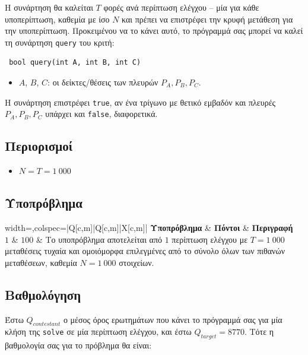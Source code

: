 \documentclass[12pt]{article}
\begin{document}
Η συνάρτηση θα καλείται $T$ φορές ανά περίπτωση ελέγχου -- μία για κάθε υποπερίπτωση, καθεμία με ίσο $N$ και πρέπει να επιστρέφει την κρυφή μετάθεση για την υποπερίπτωση. Προκειμένου να το κάνει αυτό, το πρόγραμμά σας μπορεί να καλεί τη συνάρτηση \texttt{query} του κριτή:
\begin{lstlisting}
 bool query(int A, int B, int C)
\end{lstlisting}
\begin{itemize}
	\item $A$, $B$, $C$: οι δείκτες/θέσεις των πλευρών $P_A, P_B, P_C$.
\end{itemize}

Η συνάρτηση επιστρέφει \texttt{true}, αν ένα τρίγωνο με θετικό εμβαδόν και πλευρές $P_A,P_B,P_C$ υπάρχει και \texttt{false}, διαφορετικά.

\subsection{Περιορισμοί}
\vspace{0.1em}
\begin{itemize}
	\item $N = T = 1~000$
\end{itemize}

\subsection{Υποπρόβλημα}
\begin{table}[H]
	\begin{tblr}{width=\linewidth,colspec={|Q[c,m]|Q[c,m]|X[c,m]|}}
		\hline
		\textbf{Υποπρόβλημα} & \textbf{Πόντοι} & \textbf{Περιγραφή}\\
		\hline
		$1$ & $100$ & Το υποπρόβλημα αποτελείται από $1$ περίπτωση ελέγχου με $T=1~000$ μεταθέσεις τυχαία και ομοιόμορφα επιλεγμένες από το σύνολο όλων των πιθανών μεταθέσεων, καθεμία $N=1~000$ στοιχείων.  \\ 
		\hline
	\end{tblr}
	\caption*{Οι πόντοι ενός υποπροβλήματος απονέμονται μόνο αν όλες οι περιπτώσεις (και υποπεριπτώσεις) ελέγχου αυτού περαστούν επιτυχώς.}
\end{table}
\FloatBarrier

\newpage
\subsection{Βαθμολόγηση}

Έστω $Q_{contestant}$ ο μέσος όρος ερωτημάτων που κάνει το πρόγραμμά σας για μία κλήση της \texttt{solve} σε μία περίπτωση ελέγχου, και έστω $Q_{target}=8770$. Τότε η βαθμολογία σας για το πρόβλημα θα είναι:
\end{document}
